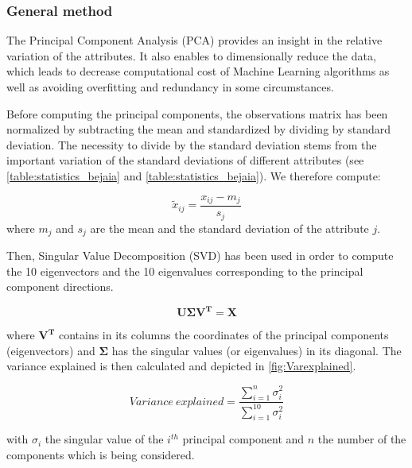 \documentclass[10pt]{article}
\numberwithin{equation}{section}
\numberwithin{figure}{section}
\numberwithin{table}{section}
\begin{document}
\subsubsection{General method}

The Principal Component Analysis (PCA) provides an insight in the relative variation of the attributes. It also enables to dimensionally reduce the data, which leads to decrease computational cost of Machine Learning algorithms as well as avoiding overfitting and redundancy in some circumstances.

Before computing the principal components, the observations matrix has been normalized by subtracting the mean and standardized by dividing by standard deviation. The necessity to divide by the standard deviation stems from the important variation of the standard deviations of different attributes (see \autoref{table:statistics_bejaia} and \autoref{table:statistics_bejaia}). We therefore compute:

\begin{equation}
    \widetilde{x}_{ij} = \frac{x_{ij} - m_j}{s_j}
\end{equation}
\noindent where $m_j$ and $s_j$ are the mean and the standard deviation of the attribute $j$.


\vspace{5mm}

Then, Singular Value Decomposition (SVD) has been used in order to compute the 10 eigenvectors and the 10 eigenvalues corresponding to the principal component directions.

\begin{equation}
    \boldsymbol{U \Sigma V^T} = \boldsymbol{X}
\end{equation}

\noindent where $\boldsymbol{V^T}$ contains in its columns the coordinates of the principal components (eigenvectors) and $\boldsymbol{\Sigma}$ has the singular values (or eigenvalues) in its diagonal. The variance explained is then calculated and depicted in \autoref{fig:Varexplained}.

\begin{equation}
    Variance\: explained = \frac{\sum_{i=1}^n \sigma_i^2}{\sum_{i=1}^{10} \sigma_i^2}
\end{equation}

\noindent with $\sigma_i$ the singular value of the $i^{th}$ principal component and $n$ the number of the components which is being considered. 
\end{document}
